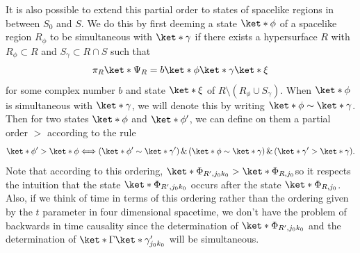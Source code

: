 \documentclass[12pt]{report}
\providecommand{\DIFadd}[1]{{\protect\color{blue}\uwave{#1}}} %
\providecommand{\DIFaddbegin}{} %
\providecommand{\DIFaddend}{} %
\begin{document}
It is also possible to extend this partial order to states of spacelike regions in between $S_0$ and $S$. We do this by first deeming a state $\ket*{\phi}$ of a spacelike region $R_\phi$ to be simultaneous with $\ket*{\gamma}$ if there exists a hypersurface $R$ with $R_\phi\subset R$ and $S_\gamma \subset R\cap S$ such that 
$$\pi_R\ket*{\Psi_R}=b\ket*{\phi}\ket*{\gamma}\ket*{\xi}$$ 
for some complex number $b$ and state $\ket*{\xi}$ of $R\setminus(R_\phi\cup S_\gamma)$. When $\ket*{\phi}$  is simultaneous with  $\ket*{\gamma}$, we will denote this by writing 
$\ket*{\phi}\sim \ket*{\gamma}$. %
%
Then for two states $\ket*{\phi}$ and $\ket*{\phi'}$, we can define on them a partial order $>$ according to the rule
\begin{equation}
\ket*{\phi'}>\ket*{\phi}\Longleftrightarrow 
(\ket*{\phi'}\sim\ket*{\gamma'}) \,\&\, (\ket*{\phi}\sim\ket*{\gamma})\, \&\, (\ket*{\gamma'}>\ket*{\gamma}).
\end{equation}
Note that according to this ordering, $\ket*{\Phi_{R', j_0k_0}}>\ket*{\Phi_{R,j_0}}$\DIFaddbegin \DIFadd{, }\DIFaddend so it respects the intuition that the state $\ket*{\Phi_{R', j_0k_0}}$ occurs after the state $\ket*{\Phi_{R,j_0}}$. Also, if we think of time in terms of this ordering rather than the ordering given by the $t$ parameter in four dimensional spacetime, we don't have the problem of backwards in time causality since the determination of $\ket*{\Phi_{R', j_0k_0}}$ and the determination of $\ket*{\Gamma}\ket*{\gamma_{j_0k_0}'}$ will be simultaneous. 
\end{document}
